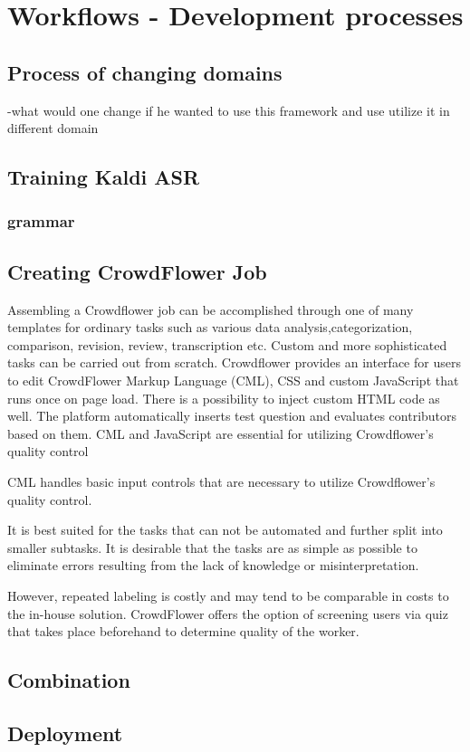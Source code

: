 \chapter{Workflows - Development processes}


\section{Process of changing domains}
  -what would one change if he wanted to use this framework and use utilize it in different domain

\section{Training Kaldi ASR}

\subsection{grammar}

\section{Creating CrowdFlower Job}

Assembling a Crowdflower job can be accomplished through one of many templates for ordinary tasks such as various data analysis,categorization, comparison, revision, review, transcription etc. %
Custom and more sophisticated tasks can be carried out from scratch.
Crowdflower provides an interface for users to edit CrowdFlower Markup Language (CML), CSS and custom JavaScript that runs once on page load.
There is a possibility to inject custom HTML code as well.
The platform automatically inserts test question and evaluates contributors based on them.
CML and JavaScript are essential for utilizing Crowdflower's quality control

CML handles basic input controls that are necessary to utilize Crowdflower's quality control. %

It is best suited for the tasks that can not be automated and further split into smaller subtasks.
It is desirable that the tasks are as simple as possible to eliminate errors resulting from the lack of knowledge or misinterpretation.

However, repeated labeling is costly and may tend to be comparable in costs to the in-house solution.
CrowdFlower offers the option of screening users via quiz that takes place beforehand to determine quality of the worker.

\section{Combination}


\section{Deployment}

